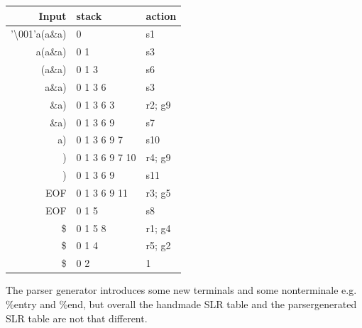 \documentclass[11pt,a4paper]{article}
\begin{document}
\begin{center}
    \begin{tabular}{r|l|l}
        Input    & stack             & action \\ \hline
  '\textbackslash001'a(a\&a)  & 0                & s1 \\
        a(a\&a)  & 0 1              & s3 \\
         (a\&a)  & 0 1 3            & s6 \\
          a\&a)  & 0 1 3 6          & s3 \\
           \&a)  & 0 1 3 6 3        & r2; g9 \\
           \&a)  & 0 1 3 6 9        & s7 \\
             a)  & 0 1 3 6 9 7      & s10 \\
              )  & 0 1 3 6 9 7 10   & r4; g9 \\
              )  & 0 1 3 6 9        & s11 \\
            EOF  & 0 1 3 6 9 11     & r3; g5 \\
            EOF  & 0 1 5            & s8 \\
             \$  & 0 1 5 8          & r1; g4 \\
             \$  & 0 1 4            & r5; g2 \\
             \$  & 0 2              & 1 \\
    \end{tabular}
\end{center}
The parser generator introduces some new terminals and some nonterminale e.g. \%entry and \%end, but overall the handmade SLR table and the parsergenerated SLR table are not that different.
\end{document}
